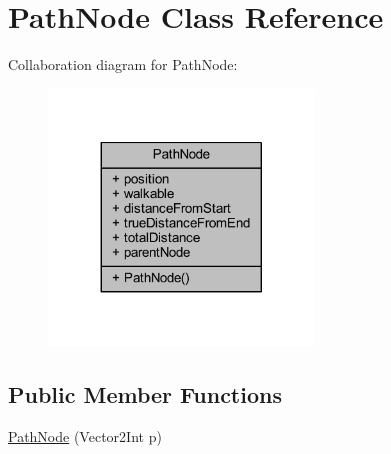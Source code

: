 \hypertarget{class_path_node}{}\section{Path\+Node Class Reference}
\label{class_path_node}


Collaboration diagram for Path\+Node\+:\nopagebreak
\begin{figure}[H]
\begin{center}
\leavevmode
\includegraphics[width=200pt]{class_path_node__coll__graph}
\end{center}
\end{figure}
\subsection*{Public Member Functions}
\begin{DoxyCompactItemize}
\item 
\mbox{\hyperlink{class_path_node_a30a770f5dcef4859cced1063f003c85c}{Path\+Node}} (Vector2\+Int p)
\end{DoxyCompactItemize}
